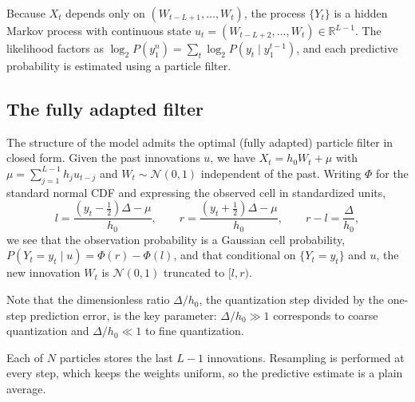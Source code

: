 \documentclass[11pt]{article}
\begin{document}
Because \(X_t\) depends only on \((W_{t-L+1},\dots,W_t)\), the process \(\{Y_t\}\) is a hidden Markov process with continuous state \(u_t = (W_{t-L+2},\dots,W_t)\in\mathbb R^{L-1}\). The likelihood factors as \(\log_2 P(y_1^n) = \sum_t \log_2 P(y_t\mid y_1^{t-1})\), and each predictive probability is estimated using a particle filter.

\subsection{The fully adapted filter}\label{the-fully-adapted-filter}

The structure of the model admits the optimal (fully adapted) particle filter \cite{PittShephard1999} in closed form. Given the past innovations \(u\), we have \(X_t = h_0 W_t + \mu\) with \(\mu = \sum_{j=1}^{L-1} h_j u_{t-j}\) and \(W_t \sim \mathcal N(0,1)\) independent of the past. Writing \(\Phi\) for the standard normal CDF and expressing the observed cell in standardized units,
\[l = \frac{(y_t-\tfrac12)\Delta - \mu}{h_0}, \qquad r = \frac{(y_t+\tfrac12)\Delta - \mu}{h_0}, \qquad r - l = \frac{\Delta}{h_0},\]
we see that the observation probability is a Gaussian cell probability, \(P(Y_t = y_t \mid u) = \Phi(r) - \Phi(l)\), and that conditional on \(\{Y_t = y_t\}\) and \(u\), the new innovation \(W_t\) is \(\mathcal N(0,1)\) truncated to \([l, r)\).

Note that the dimensionless ratio \(\Delta/h_0\), the quantization step divided by the one-step prediction error, is the key parameter: \(\Delta/h_0 \gg 1\) corresponds to coarse quantization and \(\Delta/h_0 \ll 1\) to fine quantization.

Each of \(N\) particles stores the last \(L-1\) innovations. Resampling is performed at every step, which keeps the weights uniform, so the predictive estimate is a plain average.
\end{document}

